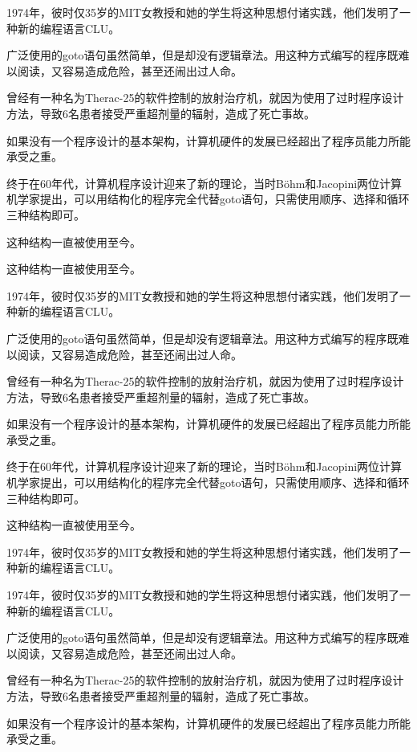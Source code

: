 \documentclass[custom]{linearbook}
\begin{document}
\begin{fullwidth}

  1974年，彼时仅35岁的MIT女教授和她的学生将这种思想付诸实践，他们发明了一种新的编程语言CLU。

  广泛使用的goto语句虽然简单，但是却没有逻辑章法。用这种方式编写的程序既难以阅读，又容易造成危险，甚至还闹出过人命。
  
  曾经有一种名为Therac-25的软件控制的放射治疗机，就因为使用了过时程序设计方法，导致6名患者接受严重超剂量的辐射，造成了死亡事故。
  
  如果没有一个程序设计的基本架构，计算机硬件的发展已经超出了程序员能力所能承受之重。
  
  终于在60年代，计算机程序设计迎来了新的理论，当时Böhm和Jacopini两位计算机学家提出，可以用结构化的程序完全代替goto语句，只需使用顺序、选择和循环三种结构即可。
  
  这种结构一直被使用至今。
\end{fullwidth}
这种结构一直被使用至今。

1974年，彼时仅35岁的MIT女教授和她的学生将这种思想付诸实践，他们发明了一种新的编程语言CLU。

广泛使用的goto语句虽然简单，但是却没有逻辑章法。用这种方式编写的程序既难以阅读，又容易造成危险，甚至还闹出过人命。

曾经有一种名为Therac-25的软件控制的放射治疗机，就因为使用了过时程序设计方法，导致6名患者接受严重超剂量的辐射，造成了死亡事故。

如果没有一个程序设计的基本架构，计算机硬件的发展已经超出了程序员能力所能承受之重。

终于在60年代，计算机程序设计迎来了新的理论，当时Böhm和Jacopini两位计算机学家提出，可以用结构化的程序完全代替goto语句，只需使用顺序、选择和循环三种结构即可。

这种结构一直被使用至今。

1974年，彼时仅35岁的MIT女教授和她的学生将这种思想付诸实践，他们发明了一种新的编程语言CLU。

1974年，彼时仅35岁的MIT女教授和她的学生将这种思想付诸实践，他们发明了一种新的编程语言CLU。

广泛使用的goto语句虽然简单，但是却没有逻辑章法。用这种方式编写的程序既难以阅读，又容易造成危险，甚至还闹出过人命。

曾经有一种名为Therac-25的软件控制的放射治疗机，就因为使用了过时程序设计方法，导致6名患者接受严重超剂量的辐射，造成了死亡事故。

如果没有一个程序设计的基本架构，计算机硬件的发展已经超出了程序员能力所能承受之重。
\end{document}
